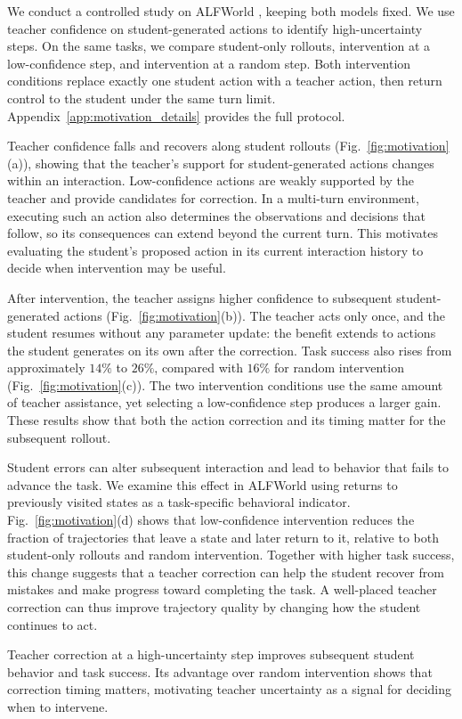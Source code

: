 We conduct a controlled study on ALFWorld \citep{shridhar2021alfworld}, keeping both models fixed. We use teacher confidence on student-generated actions to identify high-uncertainty steps. On the same tasks, we compare student-only rollouts, intervention at a low-confidence step, and intervention at a random step. Both intervention conditions replace exactly one student action with a teacher action, then return control to the student under the same turn limit. Appendix~\ref{app:motivation_details} provides the full protocol.

Teacher confidence falls and recovers along student rollouts (Fig.~\ref{fig:motivation}(a)), showing that the teacher's support for student-generated actions changes within an interaction. Low-confidence actions are weakly supported by the teacher and provide candidates for correction. In a multi-turn environment, executing such an action also determines the observations and decisions that follow, so its consequences can extend beyond the current turn. This motivates evaluating the student's proposed action in its current interaction history to decide when intervention may be useful.

After intervention, the teacher assigns higher confidence to subsequent student-generated actions (Fig.~\ref{fig:motivation}(b)). The teacher acts only once, and the student resumes without any parameter update: the benefit extends to actions the student generates on its own after the correction. Task success also rises from approximately $14\%$ to $26\%$, compared with $16\%$ for random intervention (Fig.~\ref{fig:motivation}(c)). The two intervention conditions use the same amount of teacher assistance, yet selecting a low-confidence step produces a larger gain. These results show that both the action correction and its timing matter for the subsequent rollout.

Student errors can alter subsequent interaction and lead to behavior that fails to advance the task. We examine this effect in ALFWorld using returns to previously visited states as a task-specific behavioral indicator. Fig.~\ref{fig:motivation}(d) shows that low-confidence intervention reduces the fraction of trajectories that leave a state and later return to it, relative to both student-only rollouts and random intervention. Together with higher task success, this change suggests that a teacher correction can help the student recover from mistakes and make progress toward completing the task. A well-placed teacher correction can thus improve trajectory quality by changing how the student continues to act.

Teacher correction at a high-uncertainty step improves subsequent student behavior and task success. Its advantage over random intervention shows that correction timing matters, motivating teacher uncertainty as a signal for deciding when to intervene.
